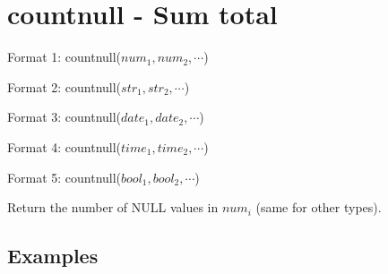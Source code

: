 
%

\section{countnull - Sum total\label{sect:countnull}}

Format 1: countnull($num_1,num_2,\cdots$)

Format 2: countnull($str_1,str_2,\cdots$)

Format 3: countnull($date_1,date_2,\cdots$)

Format 4: countnull($time_1,time_2,\cdots$)

Format 5: countnull($bool_1,bool_2,\cdots$)

Return the number of NULL values in $num_i$ (same for other types).


\subsection*{Examples}


%

